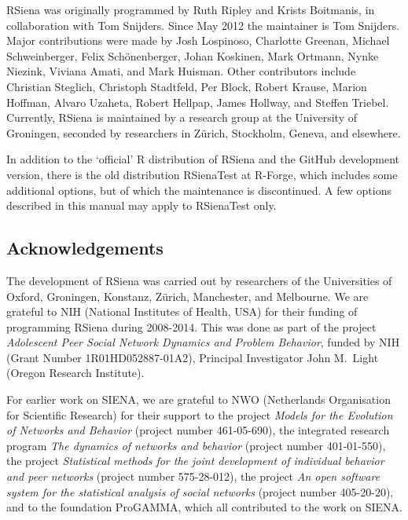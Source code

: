 \documentclass[a4paper,fleqn,11pt]{article}
\newcommand{\+}{\, + \,}
\newcommand{\sfn}[1]{\textsf{#1}}
\newcommand{\R}{{\sf R }}
\newcommand{\RS}{{\sf RSiena }}
\newcommand{\si}{{\sf SIENA}}
\begin{document}
\RS was originally programmed by Ruth Ripley and Krists Boitmanis,
in collaboration with Tom Snijders.
Since May 2012 the maintainer is Tom Snijders.
Major contributions were made by Josh Lospinoso, Charlotte Greenan,
Michael Schweinberger,
Felix Sch\"{o}nenberger, Johan Koskinen, Mark Ortmann, Nynke Niezink,
Viviana Amati, and Mark Huisman.
Other contributors include
Christian Steglich, Christoph Stadtfeld, Per Block,
Robert Krause, Marion Hoffman, Alvaro Uzaheta,
Robert Hellpap, James Hollway, and Steffen Triebel.
Currently, \RS is maintained by a research group
at the University of Groningen, seconded by researchers in Z\"{u}rich,
Stockholm, Geneva, and elsewhere.

In addition to the `official' \R distribution of \RS
and the \sfn{GitHub} development version, there is
the old distribution \sfn{RSienaTest} at \sfn{R-Forge},
which includes some additional options,
but of which the maintenance is discontinued.
A few options described in this manual may apply to
{\sf RSienaTest} only.

\subsection{Acknowledgements}

The development of \RS was carried out by researchers of the Universities
of Oxford, Groningen, Konstanz, Z\"{u}rich, Manchester, and Melbourne.
We are grateful to NIH (National Institutes of Health, USA)
for their funding of programming \RS during 2008-2014.
This was done
as part of the project \emph{Adolescent Peer Social Network Dynamics
and Problem Behavior}, funded by NIH (Grant Number 1R01HD052887-01A2),
Principal Investigator John M.\ Light (Oregon Research Institute).

For earlier work on \si, we are grateful to NWO (Netherlands Organisation for
Scientific Research) for their support to the project
\emph{Models for the Evolution of Networks and Behavior}
(project number 461-05-690),
the integrated research program
\emph{The dynamics of networks and behavior} (project number 401-01-550),
the project \emph{Statistical methods for the joint development of
individual behavior and peer networks} (project number 575-28-012),
the project \emph{An open software system for the statistical
analysis of social networks} (project number 405-20-20),
and to the foundation ProGAMMA,
which all contributed to the work on \si.

\newpage
\end{document}
